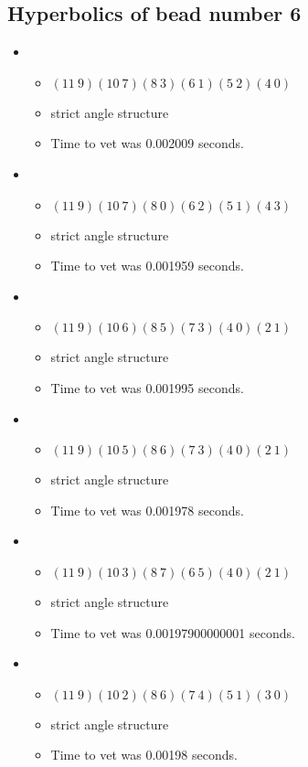 \documentclass{article}
\begin{document}
\subsection{Hyperbolics of bead number 6}
\begin{itemize}
\item \begin{itemize}
      \item $(11\ 9)(10\ 7)(8\ 3)(6\ 1)(5\ 2)(4\ 0)$
      \item strict angle structure
      \item Time to vet was 0.002009 seconds.
\end{itemize}
\item \begin{itemize}
      \item $(11\ 9)(10\ 7)(8\ 0)(6\ 2)(5\ 1)(4\ 3)$
      \item strict angle structure
      \item Time to vet was 0.001959 seconds.
\end{itemize}
\item \begin{itemize}
      \item $(11\ 9)(10\ 6)(8\ 5)(7\ 3)(4\ 0)(2\ 1)$
      \item strict angle structure
      \item Time to vet was 0.001995 seconds.
\end{itemize}
\item \begin{itemize}
      \item $(11\ 9)(10\ 5)(8\ 6)(7\ 3)(4\ 0)(2\ 1)$
      \item strict angle structure
      \item Time to vet was 0.001978 seconds.
\end{itemize}
\item \begin{itemize}
      \item $(11\ 9)(10\ 3)(8\ 7)(6\ 5)(4\ 0)(2\ 1)$
      \item strict angle structure
      \item Time to vet was 0.00197900000001 seconds.
\end{itemize}
\item \begin{itemize}
      \item $(11\ 9)(10\ 2)(8\ 6)(7\ 4)(5\ 1)(3\ 0)$
      \item strict angle structure
      \item Time to vet was 0.00198 seconds.

\end{itemize}
\end{itemize}
\end{document}
